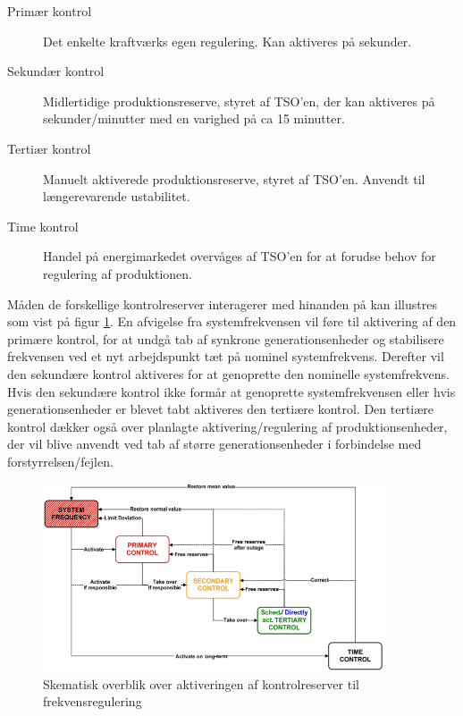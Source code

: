 \begin{description}
	\item[Primær kontrol] Det enkelte kraftværks egen regulering. Kan aktiveres på sekunder.
	\item[Sekundær kontrol] Midlertidige produktionsreserve, styret af TSO'en, der kan aktiveres på sekunder/minutter med en varighed på ca 15 minutter.
	\item[Tertiær kontrol] Manuelt aktiverede produktionsreserve, styret af TSO'en. Anvendt til længerevarende ustabilitet.
	\item[Time kontrol] Handel på energimarkedet overvåges af TSO'en for at forudse behov for regulering af produktionen.
\end{description}

Måden de forskellige kontrolreserver interagerer med hinanden på kan illustres som vist på figur \ref{fig:Frekvenskontrol}. En afvigelse fra systemfrekvensen vil føre til aktivering af den primære kontrol, for at undgå tab af synkrone generationsenheder og stabilisere frekvensen ved et nyt arbejdspunkt tæt på nominel systemfrekvens. Derefter vil den sekundære kontrol aktiveres for at genoprette den nominelle systemfrekvens. Hvis den sekundære kontrol ikke formår at genoprette systemfrekvensen eller hvis generationsenheder er blevet tabt aktiveres den tertiære kontrol. Den tertiære kontrol dækker også over planlagte aktivering/regulering af produktionsenheder, der vil blive anvendt ved tab af større generationsenheder i forbindelse med forstyrrelsen/fejlen.

\begin{figure}[H] %
	\centering
	\includegraphics[width=0.9\textwidth]{figurer/Frekvenskontrol}
	\caption{Skematisk overblik over aktiveringen af kontrolreserver til frekvensregulering}
	\label{fig:Frekvenskontrol}
\end{figure}

